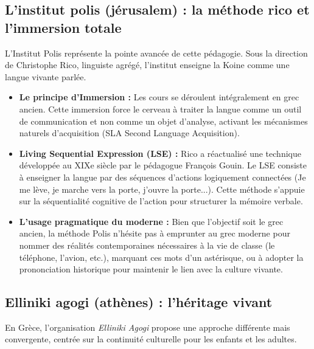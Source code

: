 \subsection{L'institut polis (jérusalem) : la méthode rico et l'immersion totale}

L'Institut Polis représente la pointe avancée de cette pédagogie.\cite{ref29} Sous la direction de
Christophe Rico, linguiste agrégé, l'institut enseigne la Koine comme une langue vivante parlée.

\begin{itemize}\item \textbf{Le principe d'Immersion :} Les cours se déroulent intégralement en grec ancien. Cette immersion force le cerveau à traiter la langue comme un outil de communication et non comme un objet d'analyse, activant les mécanismes naturels d'acquisition (SLA \- Second Language Acquisition).\cite{ref37}\item \textbf{Living Sequential Expression (LSE) :} Rico a réactualisé une technique développée au XIXe siècle par le pédagogue François Gouin.\cite{ref37} Le LSE consiste à enseigner la langue par des séquences d'actions logiquement connectées (\og Je me lève, je marche vers la porte, j'ouvre la porte...\fg{}). Cette méthode s'appuie sur la séquentialité cognitive de l'action pour structurer la mémoire verbale.\item \textbf{L'usage pragmatique du moderne :} Bien que l'objectif soit le grec ancien, la méthode Polis n'hésite pas à emprunter au grec moderne pour nommer des réalités contemporaines nécessaires à la vie de classe (le téléphone, l'avion, etc.), marquant ces mots d'un astérisque, ou à adopter la prononciation historique pour maintenir le lien avec la culture vivante.\cite{ref28}\end{itemize}

\subsection{Elliniki agogi (athènes) : l'héritage vivant}

En Grèce, l'organisation \textit{Elliniki Agogi} propose une approche différente mais convergente,
centrée sur la continuité culturelle pour les enfants et les adultes.\cite{ref39}

